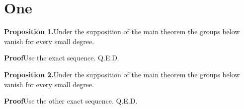 \documentclass{article}
\begin{document}
\section{One}

{\bf Proposition 1.}\quad Under the supposition of the main theorem the groups below vanish for every small degree.

{\bf Proof}\quad Use the exact sequence. Q.E.D.

{\bf Proposition 2.}\quad Under the supposition of the main theorem the groups below vanish for every small degree.

{\bf Proof}\quad Use the other exact sequence. Q.E.D.
\end{document}
